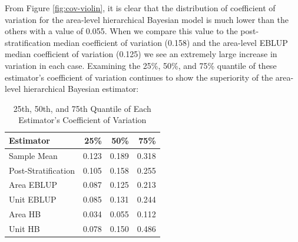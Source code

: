 \documentclass[12pt,twoside]{reedthesis}
\newenvironment{Shaded}{\begin{snugshade}}{\end{snugshade}}
\newcommand{\DataTypeTok}[1]{\textcolor[rgb]{0.13,0.29,0.53}{#1}}
\newcommand{\KeywordTok}[1]{\textcolor[rgb]{0.13,0.29,0.53}{\textbf{#1}}}
\newcommand{\NormalTok}[1]{#1}
\newcommand{\OperatorTok}[1]{\textcolor[rgb]{0.81,0.36,0.00}{\textbf{#1}}}
\newcommand{\OtherTok}[1]{\textcolor[rgb]{0.56,0.35,0.01}{#1}}
\newcommand{\StringTok}[1]{\textcolor[rgb]{0.31,0.60,0.02}{#1}}
\begin{document}
From Figure \ref{fig:cov-violin}, it is clear that the distribution of coefficient of variation for the area-level hierarchical Bayesian model is much lower than the others with a value of 0.055. When we compare this value to the post-stratification median coefficient of variation (0.158) and the area-level EBLUP median coefficient of variation (0.125) we see an extremely large increase in variation in each case. Examining the 25\%, 50\%, and 75\% quantile of these estimator's coefficient of variation continues to show the superiority of the area-level hierarchical Bayesian estimator:
\begin{longtable}[t]{lrrr}
\caption[Coefficient of Variation Quantiles]{\label{tab:quantile-table}25th, 50th, and 75th Quantile of Each Estimator's Coefficient of Variation}\\
\toprule
Estimator & 25\% & 50\% & 75\%\\
\midrule
Sample Mean & 0.123 & 0.189 & 0.318\\
Post-Stratification & 0.105 & 0.158 & 0.255\\
Area EBLUP & 0.087 & 0.125 & 0.213\\
Unit EBLUP & 0.085 & 0.131 & 0.244\\
Area HB & 0.034 & 0.055 & 0.112\\
\addlinespace
Unit HB & 0.078 & 0.150 & 0.486\\
\bottomrule
\end{longtable}
\begin{Shaded}
\end{Shaded}
\end{document}
